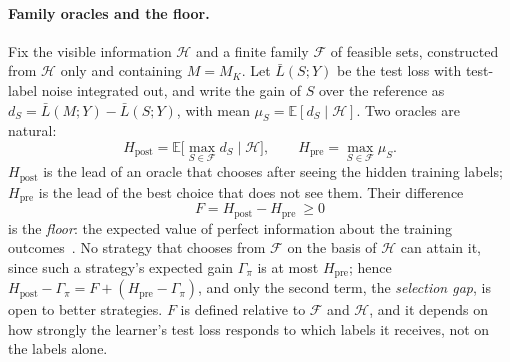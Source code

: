 \documentclass[runningheads]{llncs}
\newcommand{\Hpost}{H_{\mathrm{post}}}
\newcommand{\Hpre}{H_{\mathrm{pre}}}
\begin{document}
\paragraph{Family oracles and the floor.} Fix the visible information $\mathcal H$ and a finite family $\mathcal F$ of feasible sets, constructed from $\mathcal H$ only and containing $M=M_K$. Let $\bar L(S;Y)$ be the test loss with test-label noise integrated out, and write the gain of $S$ over the reference as $d_S=\bar L(M;Y)-\bar L(S;Y)$, with mean $\mu_S=\mathbb E[d_S\mid\mathcal H]$. Two oracles are natural:
\begin{equation}
 \Hpost=\mathbb E\big[\max_{S\in\mathcal F}d_S\mid\mathcal H\big],\qquad
 \Hpre=\max_{S\in\mathcal F}\mu_S .
\end{equation}
$\Hpost$ is the lead of an oracle that chooses after seeing the hidden training labels; $\Hpre$ is the lead of the best choice that does not see them. Their difference
\begin{equation}
 F=\Hpost-\Hpre\ \ge 0
\end{equation}
is the \emph{floor}: the expected value of perfect information about the training outcomes~\cite{howard1966information,raiffa1961applied}. No strategy that chooses from $\mathcal F$ on the basis of $\mathcal H$ can attain it, since such a strategy's expected gain $\Gamma_\pi$ is at most $\Hpre$; hence $\Hpost-\Gamma_\pi = F+(\Hpre-\Gamma_\pi)$, and only the second term, the \emph{selection gap}, is open to better strategies. $F$ is defined relative to $\mathcal F$ and $\mathcal H$, and it depends on how strongly the learner's test loss responds to which labels it receives, not on the labels alone.
\end{document}
